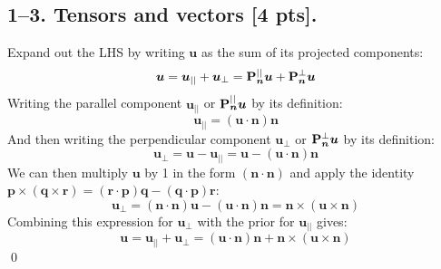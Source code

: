 \subsection*{1--3. \textbf{Tensors and vectors} [4 pts].}
Expand out the LHS by writing $\bm{u}$ as the sum of its projected components:
\begin{equation}
    \bm{u} = \bm{u}_{||} + \bm{u}_{\perp} = \mathbf{P}_{\bm{n}}^{||}\bm{u} + \mathbf{P}_{\bm{n}}^{\perp}\bm{u}
\end{equation}
Writing the parallel component $\bm{u}_{||}$ or $\mathbf{P}_{\bm{n}}^{||}\bm{u}$ by its definition:
\begin{equation}
    \bm{u}_{||} = (\bm{u} \cdot \bm{n}) \bm{n}
\end{equation}
And then writing the perpendicular component $\bm{u}_{\perp}$ or $\mathbf{P}_{\bm{n}}^{\perp}\bm{u}$ by its definition:
\begin{equation}
    \bm{u}_{\perp} = \bm{u} - \bm{u}_{||} = \bm{u} - (\bm{u} \cdot \bm{n}) \bm{n}
\end{equation}
We can then multiply $\bm{u}$ by 1 in the form $(\bm{n} \cdot \bm{n})$ and apply the identity $\bm{p} \times (\bm{q} \times \bm{r}) = (\bm{r} \cdot \bm{p})\bm{q} - (\bm{q} \cdot \bm{p})\bm{r}$:
\begin{equation}
    \bm{u}_{\perp} = (\bm{n}\cdot\bm{n})\bm{u} - (\bm{u} \cdot \bm{n}) \bm{n} = \bm{n} \times(\bm{u} \times \bm{n})
\end{equation}
Combining this expression for $\bm{u}_{\perp}$ with the prior for $\bm{u}_{||}$ gives:
\begin{equation}
    \bm{u} = \bm{u}_{||} + \bm{u}_{\perp} = (\bm{u} \cdot \bm{n}) \bm{n} + \bm{n} \times(\bm{u} \times \bm{n})
\end{equation} \qed



